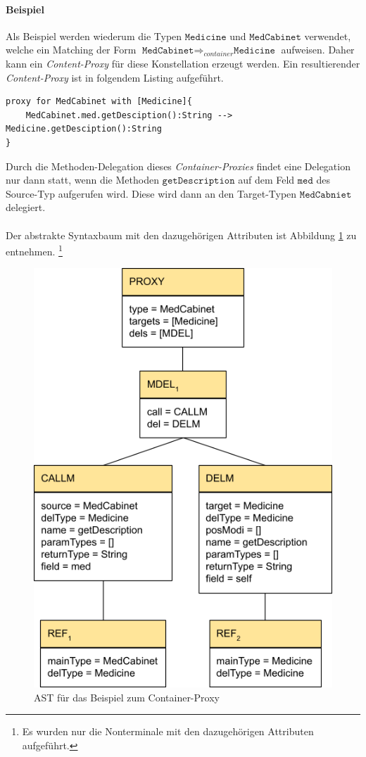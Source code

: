\documentclass[a4paper,12pt]{article}
\begin{document}
\paragraph{Beispiel}
Als Beispiel werden wiederum die Typen $\texttt{Medicine}$ und $\texttt{MedCabinet}$ verwendet, welche ein Matching der Form $\texttt{MedCabinet} \Rightarrow_{container} \texttt{Medicine}$ aufweisen. Daher kann ein \emph{Content-Proxy} für diese Konstellation erzeugt werden. Ein resultierender \emph{Content-Proxy} ist in folgendem Listing aufgeführt.
\begin{lstlisting}[style = dsl, caption = Container-Proxy für MedCabniet, captionpos = b ]
proxy for MedCabinet with [Medicine]{
	MedCabinet.med.getDesciption():String --> Medicine.getDesciption():String
}
\end{lstlisting}
Durch die Methoden-Delegation dieses \emph{Container-Proxies} findet eine Delegation nur dann statt, wenn die Methoden $\texttt{getDescription}$ auf dem Feld $\texttt{med}$ des Source-Typ aufgerufen wird. Diese wird dann an den Target-Typen $\texttt{MedCabniet}$ delegiert.\\\\
Der abstrakte Syntaxbaum mit den dazugehörigen Attributen ist Abbildung \ref{fig:ASTCONTAINER} zu entnehmen. \footnote{Es wurden nur die Nonterminale mit den dazugehörigen Attributen aufgeführt.}
\begin{figure}[h!]
\centering
\includegraphics[width=0.5\linewidth]{AST_ContainerExample}
\caption{AST für das Beispiel zum Container-Proxy}
\label{fig:ASTCONTAINER}
\end{figure}
\noindent
\end{document}
